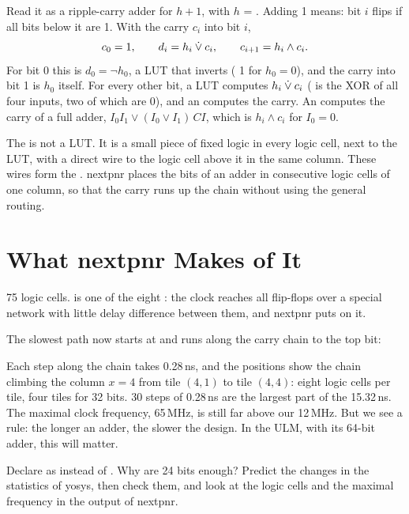 
Read it as a ripple-carry adder for $h + 1$, with $h$ = . Adding
1 means: bit $i$ flips if all bits below it are 1. With the carry $c_i$ into
bit $i$,
\[
  c_0 = 1, \qquad
  d_i = h_i \mathbin{\dot{\lor}} c_i, \qquad
  c_{i+1} = h_i \wedge c_i .
\]
For bit 0 this is $d_0 = \neg h_0$, a LUT that inverts ( 1 for
$h_0 = 0$), and the carry into bit 1 is $h_0$ itself. For every other bit, a
LUT computes $h_i \mathbin{\dot{\lor}} c_i$ ( is the XOR of all four
inputs, two of which are 0), and an  computes the carry. An
 computes the carry of a full adder, $I_0 I_1 \vee (I_0 \vee
I_1)\,\mathit{CI}$, which is $h_i \wedge c_i$ for $I_0 = 0$.

The  is not a LUT. It is a small piece of fixed logic in every
logic cell, next to the LUT, with a direct wire to the logic cell above it in
the same column. These wires form the . nextpnr places the
bits of an adder in consecutive logic cells of one column, so that the carry
runs up the chain without using the general routing.

\section{What nextpnr Makes of It}
\label{sec:step03-pnr}


75 logic cells.  is one of the eight : the
clock reaches all flip-flops over a special network with little delay
difference between them, and nextpnr puts  on it.

The slowest path now starts at  and runs along the carry
chain to the top bit:


Each step along the chain takes 0.28\,ns, and the positions show the chain
climbing the column $x = 4$ from tile $(4,1)$ to tile $(4,4)$: eight logic
cells per tile, four tiles for 32 bits. 30 steps of 0.28\,ns are the largest
part of the 15.32\,ns. The maximal clock frequency, 65\,MHz, is still far
above our 12\,MHz. But we see a rule: the longer an adder, the slower the
design. In the ULM, with its 64-bit adder, this will matter.

\begin{exercise}
\label{ex:step03-width}
Declare  as  instead of . Why
are 24 bits enough? Predict the changes in the statistics of yosys, then check
them, and look at the logic cells and the maximal frequency in the output of
nextpnr.
\end{exercise}

